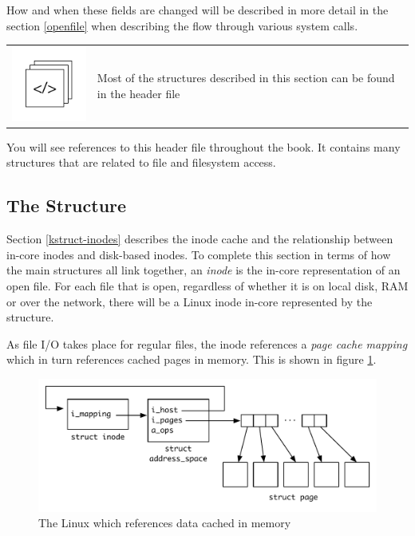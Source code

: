\noindent
How and when these fields are changed will be described in more detail in the section \ref{openfile} when describing the flow through various system calls.

\begin{table}[h]
\begin{tabular}{ll}
\parbox[l]{0.6in}{\includegraphics[scale=0.8]{figures/src-xref.pdf}} & \parbox[l]{4in}{\small{Most of the structures described in this section can be found in the header file }}
\end{tabular}
\end{table}

\noindent
You will see references to this header file throughout the book. It contains many structures that are related to file and filesystem access.


\subsection{The  Structure}

Section \ref{kstruct-inodes} describes the inode cache and the relationship between in-core inodes and disk-based inodes. To complete this section in terms of how the main structures all link together, an \textit{inode} is the in-core representation of an open file. For each file that is open, regardless of whether it is on local disk, RAM or over the network, there will be a Linux inode in-core represented by the  structure.

As file I/O takes place for regular files, the inode references a \textit{page cache mapping} which in turn references cached pages in memory. This is shown in figure \ref{fig:kstruct-inode-pages}.

\begin{figure}[h]
	\includegraphics[scale=0.6]{figures/kstruct-inode-pages.pdf}
	\centering
	\caption{The Linux  which references data cached in memory}
	\label{fig:kstruct-inode-pages}
\end{figure}

